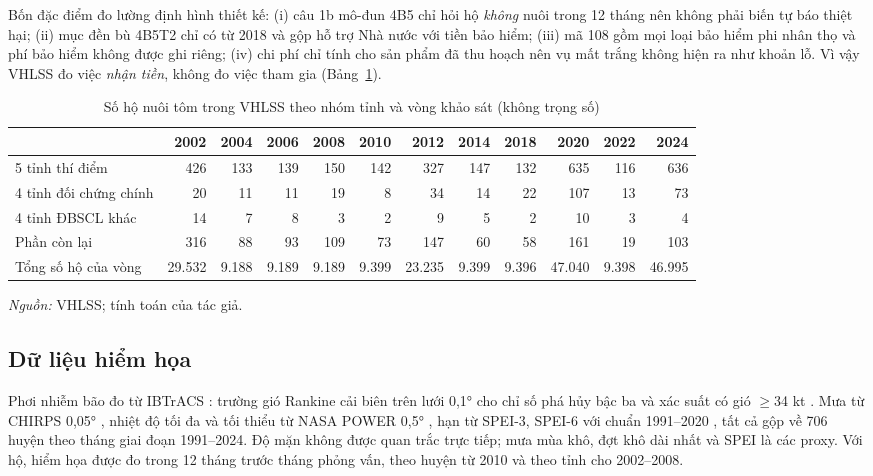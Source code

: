 \documentclass[12pt,a4paper]{article}
\begin{document}
Bốn đặc điểm đo lường định hình thiết kế: (i) câu 1b mô-đun 4B5 chỉ hỏi hộ \emph{không} nuôi trong 12 tháng nên không phải biến tự báo thiệt hại; (ii) mục đền bù 4B5T2 chỉ có từ 2018 và gộp hỗ trợ Nhà nước với tiền bảo hiểm; (iii) mã 108 gồm mọi loại bảo hiểm phi nhân thọ và phí bảo hiểm không được ghi riêng; (iv) chi phí chỉ tính cho sản phẩm đã thu hoạch nên vụ mất trắng không hiện ra như khoản lỗ. Vì vậy VHLSS đo việc \emph{nhận tiền}, không đo việc tham gia (Bảng~\ref{tab:vhlss_n}).

\begin{table}[!tbp]
\centering\scriptsize
\caption{Số hộ nuôi tôm trong VHLSS theo nhóm tỉnh và vòng khảo sát (không trọng số)}
\label{tab:vhlss_n}
\setlength{\tabcolsep}{3.2pt}
\begin{tabular}{@{}lrrrrrrrrrrr@{}}
\toprule
 & 2002 & 2004 & 2006 & 2008 & 2010 & 2012 & 2014 & 2018 & 2020 & 2022 & 2024 \\
\midrule
5 tỉnh thí điểm & 426 & 133 & 139 & 150 & 142 & 327 & 147 & 132 & 635 & 116 & 636 \\
4 tỉnh đối chứng chính & 20 & 11 & 11 & 19 & 8 & 34 & 14 & 22 & 107 & 13 & 73 \\
4 tỉnh ĐBSCL khác & 14 & 7 & 8 & 3 & 2 & 9 & 5 & 2 & 10 & 3 & 4 \\
Phần còn lại & 316 & 88 & 93 & 109 & 73 & 147 & 60 & 58 & 161 & 19 & 103 \\
\midrule
Tổng số hộ của vòng & 29.532 & 9.188 & 9.189 & 9.189 & 9.399 & 23.235 & 9.399 & 9.396 & 47.040 & 9.398 & 46.995 \\
\bottomrule
\end{tabular}
\begin{minipage}{\textwidth}\footnotesize
\textit{Nguồn:} VHLSS; tính toán của tác giả.
\end{minipage}
\end{table}

\subsection{Dữ liệu hiểm họa}

Phơi nhiễm bão đo từ IBTrACS \parencite{knapp2010}: trường gió Rankine cải biên trên lưới 0,1° cho chỉ số phá hủy bậc ba và xác suất có gió $\geq$34 kt \parencite{emanuel2005,strobl2011}. Mưa từ CHIRPS 0,05° \parencite{funk2015}, nhiệt độ tối đa và tối thiểu từ NASA POWER 0,5° \parencite{sparks2018}, hạn từ SPEI-3, SPEI-6 với chuẩn 1991--2020 \parencite{vicente2010}, tất cả gộp về 706 huyện theo tháng giai đoạn 1991--2024. Độ mặn không được quan trắc trực tiếp; mưa mùa khô, đợt khô dài nhất và SPEI là các proxy. Với hộ, hiểm họa được đo trong 12 tháng trước tháng phỏng vấn, theo huyện từ 2010 và theo tỉnh cho 2002--2008.
\end{document}
